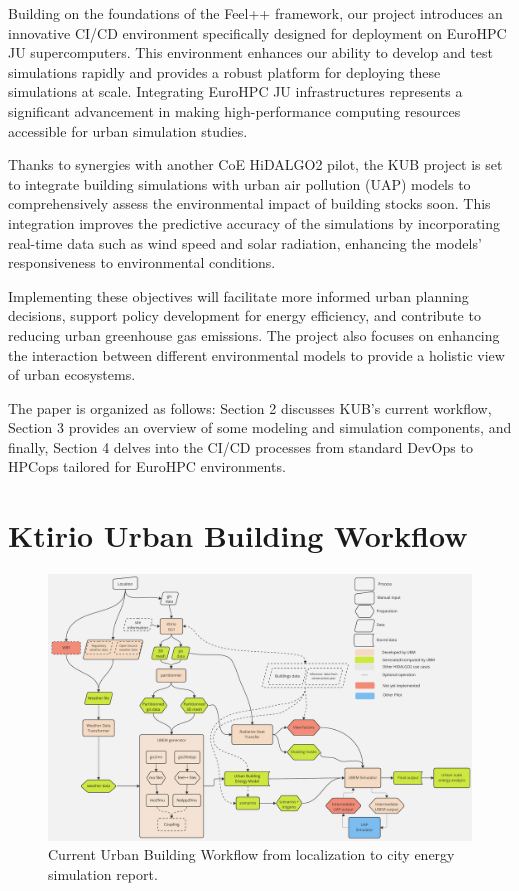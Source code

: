 \documentclass[runningheads]{llncs}
\begin{document}
Building on the foundations of the Feel++ framework, our project introduces an innovative CI/CD environment specifically designed for deployment on EuroHPC JU supercomputers. This environment enhances our ability to develop and test simulations rapidly and provides a robust platform for deploying these simulations at scale. Integrating EuroHPC JU infrastructures represents a significant advancement in making high-performance computing resources accessible for urban simulation studies.

Thanks to synergies with another CoE HiDALGO2 pilot, the KUB project is set to integrate building simulations with urban air pollution (UAP) models to comprehensively assess the environmental impact of building stocks soon. This integration improves the predictive accuracy of the simulations by incorporating real-time data such as wind speed and solar radiation, enhancing the models' responsiveness to environmental conditions.

Implementing these objectives will facilitate more informed urban planning decisions, support policy development for energy efficiency, and contribute to reducing urban greenhouse gas emissions. The project also focuses on enhancing the interaction between different environmental models to provide a holistic view of urban ecosystems.

The paper is organized as follows: Section 2 discusses KUB's current workflow, Section 3 provides an overview of some modeling and simulation components, and finally, Section 4 delves into the CI/CD processes from standard DevOps to HPCops tailored for EuroHPC environments.


\section{Ktirio Urban Building Workflow}
\label{sec:kub-workflow}


\begin{figure}
    \centering
    \includegraphics[width=.9\textwidth]{img-kub-workflow.pdf}
    \caption{Current Urban Building Workflow from localization to city energy simulation report.}
    \label{fig:kub-workflow}
\end{figure}
\end{document}
